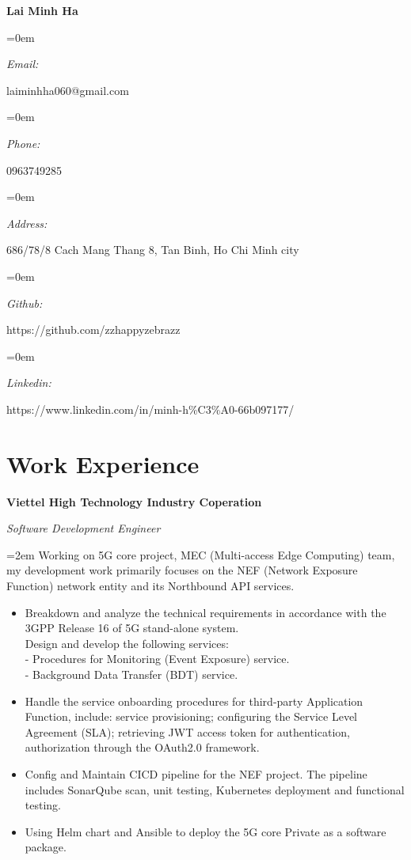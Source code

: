 \documentclass[10pt]{article}
\newlength{\spacebox}
\newcommand{\name}[1]{
\Huge %
\fontfamily{phv}\selectfont %
\begin{center} \textbf{#1} \end{center}\par
\normalsize\normalfont}
\newcommand{\motto}[1]{
  \large %
  \fontfamily{phv}\selectfont %
  \begin{center} \textsl{#1}\end{center}\par
  \normalsize \normalfont}
\newcommand{\info}[2]{
  \noindent\hangindent=0em\hangafter=0
  \parbox{\spacebox}{%
  \textit{#1}} %
  #2 \par} %
\newcommand{\work}[4]{
  \noindent  \textbf{#1}
  \hfill 
\framebox{%
  \parbox{9em}{%
  \centering\textbf{#2}}} \par
  \noindent \textit{#3} \par
  \vspace*{0.5em}
  \noindent\hangindent=2em\hangafter=0 \small #4 
\normalsize \par}
\begin{document}
\name{Lai Minh Ha}
\vspace*{-13pt}
\motto{}

\info{Email:}{laiminhha060@gmail.com}
\info{Phone:}{0963749285}
\info{Address:}{686/78/8 Cach Mang Thang 8, Tan Binh, Ho Chi Minh city}
\info{Github:}{https://github.com/zzhappyzebrazz}
\info{Linkedin:}{https://www.linkedin.com/in/minh-h\%C3\%A0-66b097177/}

\section*{Work Experience}
\work{Viettel High Technology Industry Coperation}
{May 2023--Now}
{Software Development Engineer}
{Working on 5G core project, MEC (Multi-access Edge Computing) team, my development work primarily focuses on the NEF (Network Exposure Function) network entity and its Northbound API services.

\begin{itemize}
    \item Breakdown and analyze the technical requirements in accordance with the 3GPP Release 16 of 5G stand-alone system.
    \\ Design and develop the following services:
    \\ - Procedures for Monitoring (Event Exposure) service.
    \\ - Background Data Transfer (BDT) service.
    \item Handle the service onboarding procedures for third-party Application Function, include: service provisioning; configuring the Service Level Agreement (SLA); retrieving JWT access token for authentication, authorization through the OAuth2.0 framework.
    \item Config and Maintain CICD pipeline for the NEF project. The pipeline includes SonarQube scan, unit testing, Kubernetes deployment and functional testing.
    \item Using Helm chart and Ansible to deploy the 5G core Private as a software package.
\end{itemize}}
\end{document}
